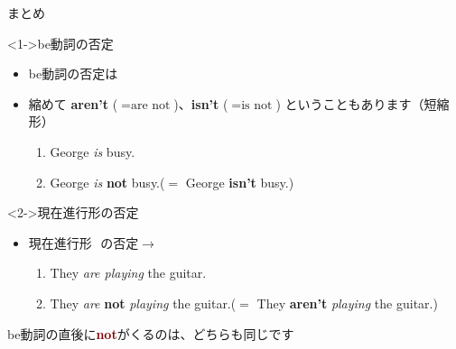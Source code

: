 \documentclass[aspectratio=169,xcolor={dvipsnames,table}]{beamer}
\begin{document}
\begin{frame}[plain]{まとめ}
 
       \begin{exampleblock}<1->{be動詞の否定}\small
\begin{itemize}
 \item  be動詞の否定は\,\,
 \item  縮めて {\bfseries aren't}\,\,($=\text{are not}$)、{\bfseries isn't}\,\,($=\text{is not}$) ということもあります（短縮形）
\begin{enumerate}
 \item George {\itshape is} busy.
 \item George {\itshape is} {\bfseries not} busy.($=$ George {\bfseries isn't} busy.)
\end{enumerate}


\end{itemize}
      \end{exampleblock}

\begin{exampleblock}<2->{現在進行形の否定}\small
\begin{itemize}
 \item  現在進行形\,\,\,\,の否定$\longrightarrow$\,\,%

\begin{enumerate}
 \item They {\itshape are playing} the guitar.
 \item They {\itshape are} {\bfseries not} {\itshape playing} the guitar.($=$ They {\bfseries aren't} {\itshape playing} the guitar.)
\end{enumerate}
\end{itemize}
      \end{exampleblock}

\hfill{}be動詞の直後に\textcolor{Maroon}{\bfseries not}がくるのは、どちらも同じです\hspace{1\zw}
\end{frame}
\end{document}
